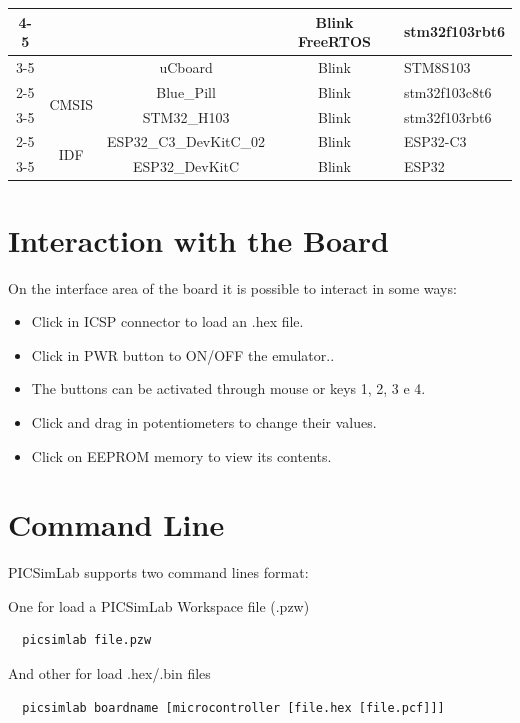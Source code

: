 {\begin{tabular}{|c|c|c|c|p{8cm}|}
\cline{4-5}
 &  &   & \multirow{1}{*}{Blink FreeRTOS} & stm32f103rbt6\\
\cline{3-5}
 &  & \multirow{1}{*}{uCboard}  & \multirow{1}{*}{Blink} & STM8S103\\
\cline{2-5}
 & \multirow{2}{*}{CMSIS} & \multirow{1}{*}{Blue\_Pill}  & \multirow{1}{*}{Blink} & stm32f103c8t6\\
\cline{3-5}
 &  & \multirow{1}{*}{STM32\_H103}  & \multirow{1}{*}{Blink} & stm32f103rbt6\\
\cline{2-5}
 & \multirow{2}{*}{IDF} & \multirow{1}{*}{ESP32\_C3\_DevKitC\_02}  & \multirow{1}{*}{Blink} & ESP32-C3\\
\cline{3-5}
 &  & \multirow{1}{*}{ESP32\_DevKitC}  & \multirow{1}{*}{Blink} & ESP32\\
\hline
\end{tabular}
}


\section{Interaction with the Board}

On the interface area of the board it is possible to interact in some ways:

\begin{itemize}
 \item Click in ICSP connector to load an .hex file.
 \item Click in PWR button to ON/OFF the emulator..
 \item The buttons can be activated through mouse or keys 1, 2, 3 e 4.
 \item Click and drag in potentiometers to change their values.
 \item Click on EEPROM memory to view its contents.
\end{itemize}


\section{Command Line}

PICSimLab supports two command lines format:

One for load a PICSimLab Workspace file (.pzw) 
\begin{verbatim}
  picsimlab file.pzw
\end{verbatim}

And other for load .hex/.bin files
\begin{verbatim}
  picsimlab boardname [microcontroller [file.hex [file.pcf]]]
\end{verbatim}

